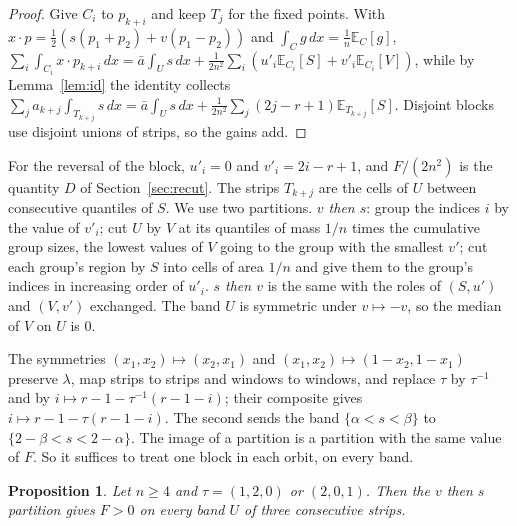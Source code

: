 \documentclass[11pt]{amsart}
\newtheorem{proposition}[theorem]{Proposition}
\theoremstyle{definition}
\theoremstyle{remark}
\numberwithin{equation}{section}
\newcommand{\E}{\mathbb{E}}
\begin{document}
\begin{proof}
Give $C_i$ to $p_{k+i}$ and keep $T_j$ for the fixed points. With $x\cdot p=\frac12(s(p_1+p_2)+v(p_1-p_2))$ and
$\int_C g\,dx=\frac1n\E_C[g]$,
$\sum_i\int_{C_i}x\cdot p_{k+i}\,dx=\bar a\int_Us\,dx+\frac1{2n^2}\sum_i(u'_i\E_{C_i}[S]+v'_i\E_{C_i}[V])$, while by
Lemma~\ref{lem:id} the identity collects
$\sum_ja_{k+j}\int_{T_{k+j}}s\,dx=\bar a\int_Us\,dx+\frac1{2n^2}\sum_j(2j-r+1)\E_{T_{k+j}}[S]$.
Disjoint blocks use disjoint unions of strips, so the gains add.
\end{proof}

For the reversal of the block, $u'_i=0$ and $v'_i=2i-r+1$, and $F/(2n^2)$ is the quantity $D$ of
Section~\ref{sec:recut}. The strips $T_{k+j}$ are the cells of $U$ between consecutive quantiles of $S$. We use two
partitions. \emph{$v$ then $s$}: group the indices $i$ by the value of $v'_i$; cut $U$ by $V$ at its quantiles of mass
$1/n$ times the cumulative group sizes, the lowest values of $V$ going to the group with the smallest $v'$; cut each
group's region by $S$ into cells of area $1/n$ and give them to the group's indices in increasing order of $u'_i$.
\emph{$s$ then $v$} is the same with the roles of $(S,u')$ and $(V,v')$ exchanged. The band $U$ is symmetric under
$v\mapsto-v$, so the median of $V$ on $U$ is $0$.

The symmetries $(x_1,x_2)\mapsto(x_2,x_1)$ and $(x_1,x_2)\mapsto(1-x_2,1-x_1)$ preserve $\lambda$, map strips to strips
and windows to windows, and replace $\tau$ by $\tau^{-1}$ and by $i\mapsto r-1-\tau^{-1}(r-1-i)$; their composite gives
$i\mapsto r-1-\tau(r-1-i)$. The second sends the band $\{\alpha<s<\beta\}$ to $\{2-\beta<s<2-\alpha\}$. The image of a partition is a partition with the
same value of $F$. So it suffices to treat one block in each orbit, on every band.

\begin{proposition}\label{prop:r3}
Let $n\ge4$ and $\tau=(1,2,0)$ or $(2,0,1)$. Then the $v$ then $s$ partition gives $F>0$ on every band $U$ of three
consecutive strips.
\end{proposition}
\end{document}
